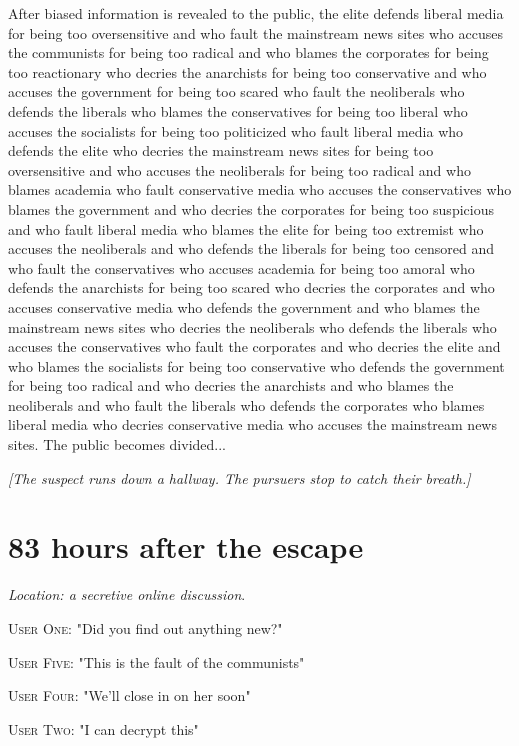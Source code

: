 \documentclass{report}
\begin{document}
After biased information is revealed to the public, the elite defends liberal media for being too oversensitive and who fault the mainstream news sites who accuses the communists for being too radical and who blames the corporates for being too reactionary who decries the anarchists for being too conservative and who accuses the government for being too scared who fault the neoliberals who defends the liberals who blames the conservatives for being too liberal who accuses the socialists for being too politicized who fault liberal media who defends the elite who decries the mainstream news sites for being too oversensitive and who accuses the neoliberals for being too radical and who blames academia who fault conservative media who accuses the conservatives who blames the government and who decries the corporates for being too suspicious and who fault liberal media who blames the elite for being too extremist who accuses the neoliberals and who defends the liberals for being too censored and who fault the conservatives who accuses academia for being too amoral who defends the anarchists for being too scared who decries the corporates and who accuses conservative media who defends the government and who blames the mainstream news sites who decries the neoliberals who defends the liberals who accuses the conservatives who fault the corporates and who decries the elite and who blames the socialists for being too conservative who defends the government for being too radical and who decries the anarchists and who blames the neoliberals and who fault the liberals who defends the corporates who blames liberal media who decries conservative media who accuses the mainstream news sites. The public becomes divided...

\textit{[The suspect runs down a hallway. The pursuers stop to catch their breath.]}


\section*{83 \small{hours after the escape}}

\textit{Location: a secretive online discussion}. 

\textsc{User One}: "Did you find out anything new?" 

\textsc{User Five}: "This is the fault of the communists" 

\textsc{User Four}: "We'll close in on her soon" 

\textsc{User Two}: "I can decrypt this" 
\end{document}
